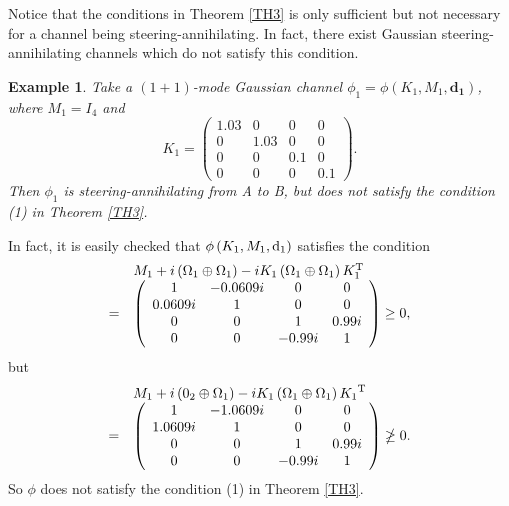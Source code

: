 \documentclass[10pt,aps,pra,amsfonts,amssymb,amsmath,%
floatfix,nofootinbib, groupedaddress,superscriptaddress,citesort,twocolumn
]{revtex4}%
\newtheorem{example}[theorem]{Example}
\begin{document}
 Notice that the conditions in Theorem \ref{TH3} is only sufficient but not necessary for a channel being  steering-annihilating. In fact, there exist Gaussian steering-annihilating channels which do not satisfy this condition.

\begin{example}
	Take a $(1+1)$-mode Gaussian channel  $\phi_1=\phi(K_1,M_1,\mathbf{d_1})$, where	$M_1=I_4$ and
$${K_1} = \left( {\begin{array}{*{20}{c}}
 		{1.03}&0&0&0\\
 		0&{1.03}&0&0\\
 		0&0&{0.1}&0\\
 		0&0&0&{0.1}
 \end{array}} \right).$$
Then $\phi_1 $ is steering-annihilating from A to B, but does not satisfy the condition (1) in Theorem \ref{TH3}.
\end{example}


In fact, it is easily checked that $\phi \left( {{K_1},{M_1},{\rm d_1}} \right)$ satisfies the condition
		\[\begin{array}{rl}
	&	{M_1} + i\left( {{\Omega _1} \oplus {\Omega _1}} \right) - i{K_1}\left( {{\Omega _1} \oplus {\Omega _1}} \right)K_1^{\rm T}\\
		=& \left( {\begin{array}{*{20}{c}}
				1&{ - 0.0609i}&0&0\\
				{0.0609i}&1&0&0\\
				0&0&1&{0.99i}\\
				0&0&{ - 0.99i}&1
		\end{array}} \right)
		\ge 0,
	\end{array}\]
	but
	\[\begin{array}{rl}
	&	{M_1} + i\left( {{0_2} \oplus {\Omega _1}} \right) - i{K_1}\left( {{\Omega _1} \oplus {\Omega _1}} \right){K_1}^{\rm T}\\
		=& \left( {\begin{array}{*{20}{c}}
				1&{ - 1.0609i}&0&0\\
				{1.0609i}&1&0&0\\
				0&0&1&{0.99i}\\
				0&0&{ - 0.99i}&1
		\end{array}} \right)
		\ngeq 0.
	\end{array}\]
So $\phi$ does not satisfy the condition (1) in Theorem \ref{TH3}.
\end{document}
